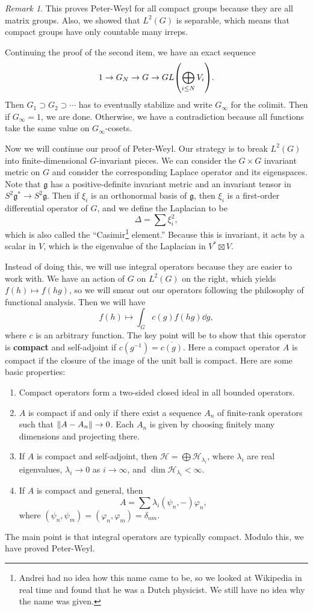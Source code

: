 \documentclass[leqno, openany]{memoir}
\theoremstyle{definition}
\theoremstyle{remark}
\newtheorem{rmk}[thm]{Remark}
\theoremstyle{plain}
\theoremstyle{definition}
\theoremstyle{remark}
\newcommand{\mc}[1]{\mathcal{#1}}
\newcommand{\mf}[1]{\mathfrak{#1}}
\newcommand{\ol}[1]{\overline{#1}}
\begin{document}
\begin{rmk}
    This proves Peter-Weyl for all compact groups because they are all matrix groups. Also, we showed that $L^2(G)$ is separable, which means that compact groups have only countable many irreps.
\end{rmk}

Continuing the proof of the second item, we have an exact sequence
\[ 1 \to G_N \to G \to GL \qty(\bigoplus_{i \leq N} V_i). \]
Then $G_1 \supset G_2 \supset \cdots $ has to eventually stabilize and write $G_{\infty}$ for the colimit. Then if $G_{\infty} = 1$, we are done. Otherwise, we have a contradiction because all functions take the same value on $G_{\infty}$-cosets.

Now we will continue our proof of Peter-Weyl. Our strategy is to break $L^2(G)$ into finite-dimensional $G$-invariant pieces. We can consider the $G \times G$ invariant metric on $G$ and consider the corresponding Laplace operator and its eigenspaces. Note that $\mf{g}$ has a positive-definite invariant metric and an invariant tensor in $S^2 \mf{g}^* \to S^2 \mf{g}$. Then if $\xi_i$ is an orthonormal basis of $\mf{g}$, then $\mf{\xi}_i$ is a first-order differential operator of $G$, and we define the Laplacian to be
\[ \Delta = \sum \xi_i^2, \]
which is also called the ``Casimir\footnote{Andrei had no idea how this name came to be, so we looked at Wikipedia in real time and found that he was a Dutch physicist. We still have no idea why the name was given.} element.'' Because this is invariant, it acts by a scalar in $V$, which is the eigenvalue of the Laplacian in $V^* \boxtimes V$.

Instead of doing this, we will use integral operators because they are easier to work with. We have an action of $G$ on $L^2(G)$ on the right, which yields $f(h) \mapsto f(hg)$, so we will smear out our operators following the philosophy of functional analysis. Then we will have
\[ f(h) \mapsto \int_G c(g) f(hg) \dd{g}, \]
where $c$ is an arbitrary function. The key point will be to show that this operator is \textbf{compact} and self-adjoint if $c(g^{-1}) = \ol{c(g)}$. Here a compact operator $A$ is compact if the closure of the image of the unit ball is compact. Here are some basic properties:
\begin{enumerate}
    \item Compact operators form a two-sided closed ideal in all bounded operators.
    \item $A$ is compact if and only if there exist a sequence $A_n$ of finite-rank operators such that $\norm{A - A_n} \to 0$. Each $A_n$ is given by choosing finitely many dimensions and projecting there.
    \item If $A$ is compact and self-adjoint, then $\mc{H} = \bigoplus \mc{H}_{\lambda_i}$, where $\lambda_i$ are real eigenvalues, $\lambda_i \to 0$ as $i \to \infty$, and $\dim \mc{H}_{\lambda_i} < \infty$.
    \item If $A$ is compact and general, then
        \[ A = \sum \lambda_i (\psi_n, -) \varphi_n, \]
        where $(\psi_n, \psi_m) = (\varphi_n, \varphi_m) =  \delta_{nm}$.
\end{enumerate}
The main point is that integral operators are typically compact. Modulo this, we have proved Peter-Weyl.
\end{document}
